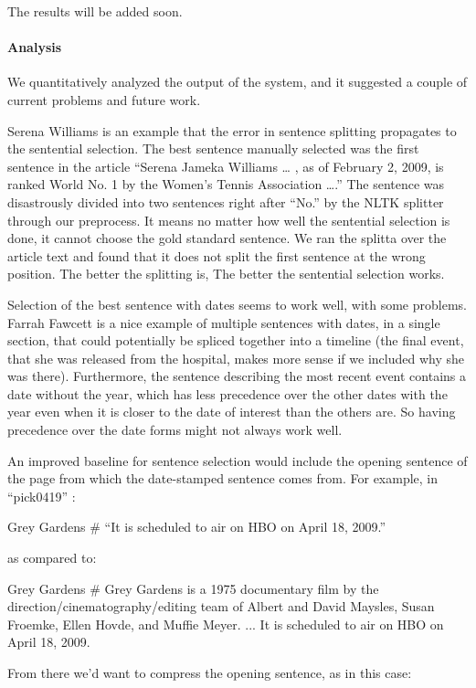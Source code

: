 \documentclass[11pt]{article}
\newcommand{\war}[1]{{\sf\small #1}}
\begin{document}
The results will be added soon.

\paragraph {Analysis}

We quantitatively analyzed the output of the system, and it suggested
a couple of current problems and future work.

\war{Serena Williams} is an example that the error in sentence splitting
propagates to the sentential selection. The best sentence manually selected
was the first sentence in the article ``Serena Jameka Williams \ldots
, as of February 2, 2009, is ranked World No. 1 by the Women's Tennis
Association \dots .'' The sentence was disastrously divided into two sentences
right after ``No.'' by the NLTK splitter through our preprocess.
It means no matter how well the sentential selection is done,
it cannot choose the gold standard sentence. We ran the splitta
\cite{dgillick09sbd} over the article text and found that it does not
split the first sentence at the wrong position. The better the splitting is,
The better the sentential selection works.

Selection of the best sentence with dates seems to work well,
with some problems.  \war{Farrah Fawcett} is a nice example of multiple sentences
with dates, in a single section, that could potentially be spliced
together into a timeline (the final event, that she was released from
the hospital, makes more sense if we included why she was there).
Furthermore, the sentence describing the most recent event contains
a date without the year, which has less precedence over the other dates with the year
even when it is closer to the date of interest than the others are.
So having precedence over the date forms might not always work well.

An improved baseline for sentence selection would include the opening
sentence of the page from which the date-stamped sentence comes from.
For example, in ``pick0419'' :

\war{Grey Gardens} \# ``It is scheduled to air on HBO on April 18, 2009.''

as compared to:

\war{Grey Gardens} \# Grey Gardens is a 1975 documentary film by the
direction/cinematography/editing team of Albert and David Maysles,
Susan Froemke, Ellen Hovde, and Muffie Meyer. ...  It is scheduled to
air on HBO on April 18, 2009.

From there we'd want to compress the opening sentence, as in this case:
\end{document}
